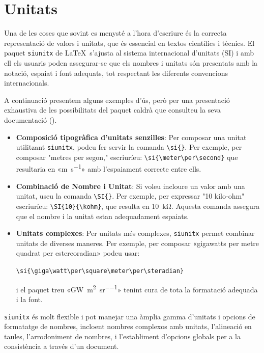 \ifcase\doclanguage\or
  \section{Unitats}
  
  Una de les coses que sovint es menysté a l'hora d'escriure és la correcta representació de valors i unitats, que és essencial en textos científics i tècnics. El paquet \texttt{siunitx} de \LaTeX\ s'ajusta al sistema internacional d'unitats (SI) i amb ell els usuaris poden assegurar-se que els nombres i unitats són presentats amb la notació, espaiat i font adequats, tot respectant les diferents convencions internacionals.
  
  A continuació presentem alguns exemples d'ús, però per una presentació exhaustiva de les possibilitats del paquet caldrà que consulteu la seva documentació (\cite{siunitx}).
  
  \begin{itemize}
    \item \textbf{Composició tipogràfica d'unitats senzilles}: Per composar una unitat utilitzant \texttt{siunitx}, podeu fer servir la comanda \verb|\si{}|. Per exemple, per composar "metres per segon," escriuríeu:
       \verb|\si{\meter\per\second}| que resultaria en «\si{\meter\per\second}» amb l'espaiament correcte entre ells.
    
    \item \textbf{Combinació de Nombre i Unitat}: Si voleu incloure un valor amb una unitat, useu la comanda \verb|\SI{}|. Per exemple, per expressar "10 kilo-ohm" escriuríeu:
       \verb|\SI{10}{\kohm}|, que resulta en \SI{10}{\kohm}. Aquesta comanda assegura que el nombre i la unitat estan adequadament espaiats.
    
    \item \textbf{Unitats complexes}: Per unitats més complexes, \texttt{siunitx} permet combinar unitats de diverses maneres. Per exemple, per composar «gigawatts per metre quadrat per estereoradian» podeu usar:
    
    \verb|\si{\giga\watt\per\square\meter\per\steradian}|
    
    i el paquet treu «\si{\giga\watt\per\square\meter\per\steradian}» tenint cura de tota la formatació adequada i la font.
  \end{itemize}

  \texttt{siunitx} és molt flexible i pot manejar una àmplia gamma d'unitats i opcions de formatatge de nombres, incloent nombres complexos amb unitats, l'alineació en taules, l'arrodoniment de nombres, i l'establiment d'opcions globals per a la consistència a través d'un document.
\or
